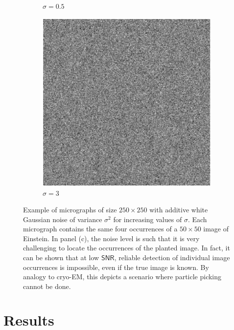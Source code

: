 \documentclass[english,11pt]{article}
\newcommand{\1}{\mathbf{1}}
\newcommand{\TODO}[1]{{\color{red}{[#1]}}}
\numberwithin{equation}{section}
\theoremstyle{plain}
\theoremstyle{definition}
\theoremstyle{remark}
\theoremstyle{plain}
\theoremstyle{remark}
\theoremstyle{plain}
\theoremstyle{plain}
\newcommand{\SNR}{\ensuremath{\textsf{SNR}}}
\begin{document}
\begin{figure}[t]
\begin{subfigure}[h]{0.33\textwidth}
		\caption{$\sigma = 0.5$}
	\end{subfigure}
	\begin{subfigure}[h]{0.33\textwidth}
		\centering
		\includegraphics[scale=0.5]{micrograph_Einstein_example_s3}
		\caption{$\sigma = 3$}
	\end{subfigure}
	\caption{\label{fig:micro_example} Example of micrographs of size $250\times 250$ with additive white Gaussian noise of variance $\sigma^2$ for increasing values of $\sigma$. Each micrograph contains the same four occurrences of a $50 \times 50$ image of Einstein. In panel (c), the noise level is such that it is very challenging to locate the occurrences of the planted image. In fact, it can be shown that at low $\SNR$, reliable detection of individual image occurrences is impossible, even if the true image is known. By analogy to cryo-EM, this depicts a scenario where particle picking cannot be done. \TODO{Do we want to replace with a cryo-EM figure? This figure will be positioned with the rest of the figures about Einstein's example}}	
\end{figure}


\section{Results} \label{sec:results}
\end{document}
